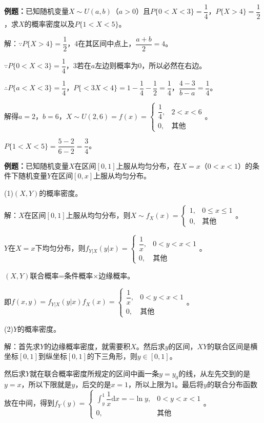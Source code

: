 \textbf{例题：}已知随机变量$X\sim U(a,b)$（$a>0$）且$P\{0<X<3\}=\dfrac{1}{4}$，$P\{X>4\}=\dfrac{1}{2}$，求$X$的概率密度以及$P\{1<X<5\}$。

解：$\because P\{X>4\}=\dfrac{1}{2}$，4在其区间中点上，$\dfrac{a+b}{2}=4$。

$\because P\{0<X<3\}=\dfrac{1}{4}$，$3$若在$a$左边则概率为0，所以必然在右边。

$\therefore P\{a<X<3\}=\dfrac{1}{4}$，$P\{<3X<4\}=1-\dfrac{1}{4}-\dfrac{1}{2}=\dfrac{1}{4}$，$\dfrac{4-3}{b-a}=\dfrac{1}{4}$。

解得$a=2$，$b=6$，$X\sim U(2,6)=f(x)=\left\{\begin{array}{ll}
    \dfrac{1}{4}, & 2<x<6 \\
    0, & \text{其他}
\end{array}\right.$。

$P\{1<X<5\}=\dfrac{5-2}{6-2}=\dfrac{3}{4}$。

\textbf{例题：}已知随机变量$X$在区间$[0,1]$上服从均匀分布，在$X=x$（$0<x<1$）的条件下随机变量$Y$在区间$[0,x]$上服从均匀分布。

(1)$(X,Y)$的概率密度。

解：$X$在区间$[0,1]$上服从均匀分布，则$X\sim f_X(x)=\left\{\begin{array}{ll}
    1, & 0\leqslant x\leqslant1 \\
    0, & \text{其他}
\end{array}\right.$。

$Y$在$X=x$下均匀分布，则$f_{Y|X}(y|x)=\left\{\begin{array}{ll}
    \dfrac{1}{x}, & 0<y<x<1 \\
    0, & \text{其他}
\end{array}\right.$。

$(X,Y)$联合概率=条件概率×边缘概率。

即$f(x,y)=f_{Y|X}(y|x)f_X(x)=\left\{\begin{array}{ll}
    \dfrac{1}{x}, & 0<y<x<1 \\
    0, & \text{其他}
\end{array}\right.$。

(2)$Y$的概率密度。

解：首先求$Y$的边缘概率密度，就需要积$X$。然后求$y$的区间，$XY$的联合区间是横坐标$[0,1]$到纵坐标$[0,1]$的下三角形，则$y\in[0,1]$。

然后求$Y$就在联合概率密度所规定的区间中画一条$y=y_0$的线，从左先交到的是$y=x$，所以下限就是$y$，后交的是$x=1$，所以上限为1。最后将$y$的联合分布函数放在中间，得到$f_Y(y)=\left\{\begin{array}{ll}
    \displaystyle{\int_y^1\dfrac{1}{x}\textrm{d}x}=-\ln y, & 0<y<x<1 \\
    0, & \text{其他}
\end{array}\right.$。

